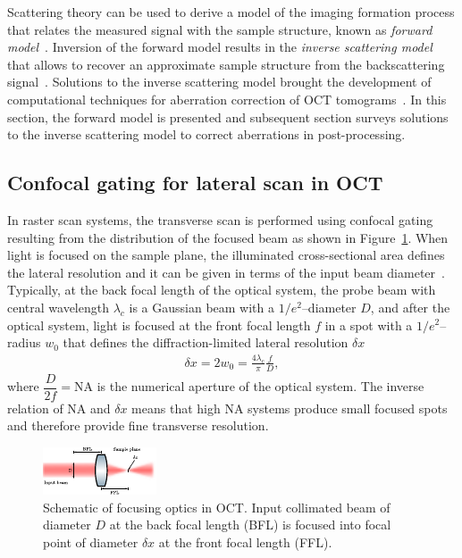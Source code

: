 Scattering theory can be used to derive a model of the imaging formation process that relates the measured signal with the sample structure, known as \textit{forward model}~\cite{Ralston2006_Inverse, Ralston2006_NonParaxial}. Inversion of the forward model results in the \textit{inverse scattering model} that allows to recover an approximate sample structure from the backscattering signal~\cite{Ralston2006_Interferometric}. Solutions to the inverse scattering model brought the development of computational techniques for aberration correction of OCT tomograms~\cite{Ralston2006_Interferometric, Yasuno2006_Noniterative, Adie2012_Computational}. In this section, the forward model is presented and subsequent section surveys solutions to the inverse scattering model to correct aberrations in post-processing.

\subsection{Confocal gating for lateral scan in OCT}

In raster scan systems, the transverse scan is performed using confocal gating resulting from the distribution of the focused beam as shown in Figure~\ref{fig:FocusingLens}. When light is focused on the sample plane, the illuminated cross-sectional area defines the lateral resolution and it can be given in terms of the input beam diameter~\cite{Yasuno2006_Noniterative}. Typically, at the back focal length of the optical system, the probe beam with central wavelength $\lambda_c$ is a Gaussian beam with a $1/e^2$--diameter $D$, and after the optical system, light is focused at the front focal length $f$ in a spot with a $1/e^2$--radius $w_0$ that defines the diffraction-limited lateral resolution $\delta x$~\cite{Fujimoto2015_Introduction}
\begin{align}
    \delta x = 2w_0 = \frac{4\lambda_c}{\pi} \frac{f}{D},
\end{align}
where $\dfrac{D}{2f} = \text{NA}$ is the numerical aperture of the optical system. The inverse relation of NA and $\delta x$ means that high NA systems produce small focused spots and therefore provide fine transverse resolution.

\begin{figure}[htb!]
    \centering
    \includegraphics[width=.6\textwidth]{Figures/TheoreticalBasis/FocusingLens.pdf}
    \caption[Schematic of focusing optics in OCT.]{Schematic of focusing optics in OCT. Input collimated beam of diameter $D$ at the back focal length (BFL) is focused into focal point of diameter $\delta x$ at the front focal length (FFL).}
    \label{fig:FocusingLens}
\end{figure}

